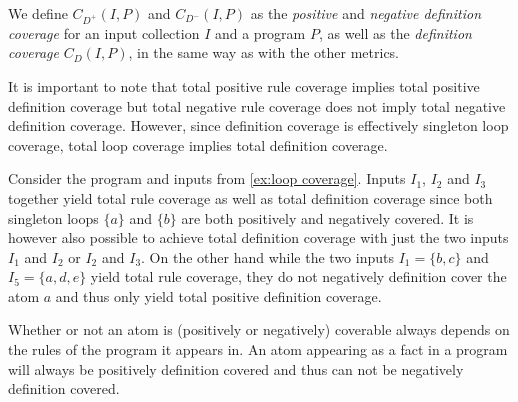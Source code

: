 We define \(C_{D^+}(I, P)\) and \(C_{D^-}(I, P)\) as the \emph{positive} and \emph{negative definition coverage} for an input collection $I$ and a program $P$, as well as the \emph{definition coverage} \(C_D(I, P)\), in the same way as with the other metrics.

It is important to note that total positive rule coverage implies total positive definition coverage but total negative rule coverage does not imply total negative definition coverage. However, since definition coverage is effectively singleton loop coverage, total loop coverage implies total definition coverage.

\begin{example}
\label{ex:definition coverage}
    Consider the program and inputs from \cref{ex:loop coverage}. Inputs $I_1$, $I_2$ and $I_3$ together yield total rule coverage as well as total definition coverage since both singleton loops \(\{a\}\) and \(\{b\}\) are both positively and negatively covered. It is however also possible to achieve total definition coverage with just the two inputs $I_1$ and $I_2$ or $I_2$ and $I_3$. On the other hand while the two inputs \(I_1 = \{b, c\}\) and \(I_5 = \{a, d, e\}\) yield total rule coverage, they do not negatively definition cover the atom $a$ and thus only yield total positive definition coverage.
\end{example}

Whether or not an atom is (positively or negatively) coverable always depends on the rules of the program it appears in. An atom appearing as a fact in a program will always be positively definition covered and thus can not be negatively definition covered.

\begin{comment}
    - 2 ways to introduce definition coverage:  \/
        
        - as a coverage metric for singleton loops (minimal loops) and therefore a special case of loop coverage        \/
    
        - as a representation of the disjunctions in the program (if an atom "a" is defined in multiple rules you could rewrite this as a if B1 v B2 v ...) -> this coverage metric covers these implicit disjunctions
    -> discuss both but in which order?     \/
    
    - Definition + example      \/
    
    (- this is different to rule coverage! -> total positive rule coverage implies total positive definition coverage, not the other way around and no connection for negative coverage!       \/
    
    - total loop coverage implies total definition coverage     \/
    
    - total program coverage implies total definition coverage)
\end{comment}

